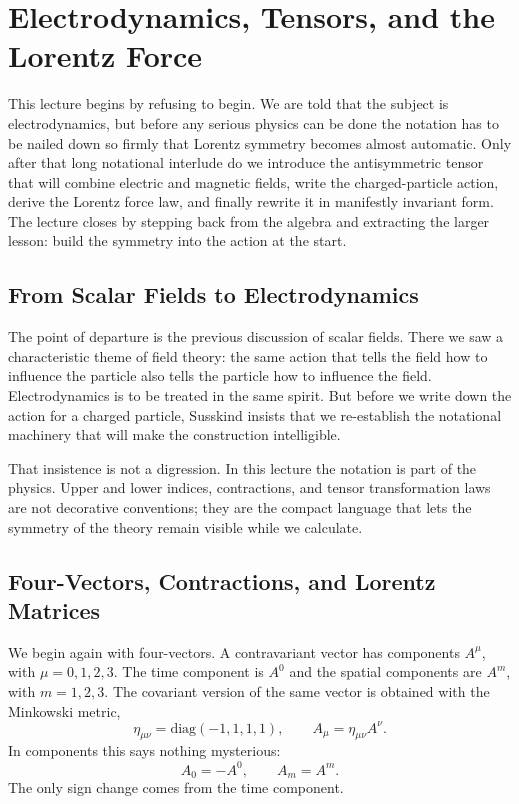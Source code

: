 \chapter{Electrodynamics, Tensors, and the Lorentz Force}

This lecture begins by refusing to begin. We are told that the subject is electrodynamics, but before any serious physics can be done the notation has to be nailed down so firmly that Lorentz symmetry becomes almost automatic. Only after that long notational interlude do we introduce the antisymmetric tensor that will combine electric and magnetic fields, write the charged-particle action, derive the Lorentz force law, and finally rewrite it in manifestly invariant form. The lecture closes by stepping back from the algebra and extracting the larger lesson: build the symmetry into the action at the start.

\section{From Scalar Fields to Electrodynamics}

The point of departure is the previous discussion of scalar fields. There we saw a characteristic theme of field theory: the same action that tells the field how to influence the particle also tells the particle how to influence the field. Electrodynamics is to be treated in the same spirit. But before we write down the action for a charged particle, Susskind insists that we re-establish the notational machinery that will make the construction intelligible.

That insistence is not a digression. In this lecture the notation is part of the physics. Upper and lower indices, contractions, and tensor transformation laws are not decorative conventions; they are the compact language that lets the symmetry of the theory remain visible while we calculate.

\section{Four-Vectors, Contractions, and Lorentz Matrices}

We begin again with four-vectors. A contravariant vector has components $A^\mu$, with $\mu=0,1,2,3$. The time component is $A^0$ and the spatial components are $A^m$, with $m=1,2,3$. The covariant version of the same vector is obtained with the Minkowski metric,
\begin{equation}
\eta_{\mu\nu}=\mathrm{diag}(-1,1,1,1),
\qquad
A_\mu=\eta_{\mu\nu}A^\nu.
\end{equation}
In components this says nothing mysterious:
\begin{equation}
A_0=-A^0,
\qquad
A_m=A^m.
\end{equation}
The only sign change comes from the time component.

